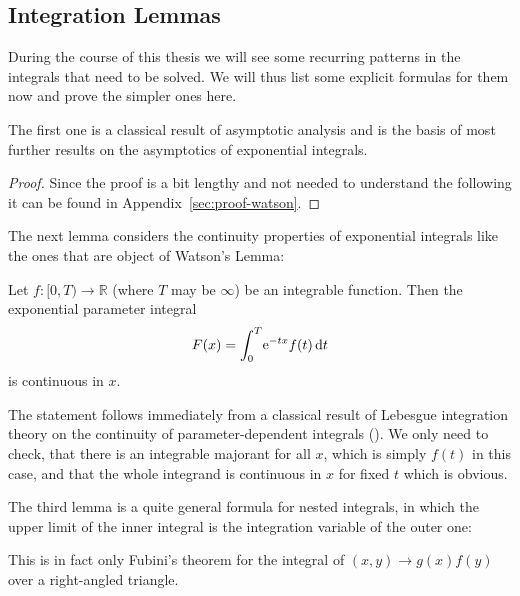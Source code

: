 \subsection{Integration Lemmas}
During the course of this thesis we will see some recurring patterns in the
integrals that need to be solved. We will thus list some explicit formulas for
them now and prove the simpler ones here.

The first one is a classical result of asymptotic analysis and is the basis of
most further results on the asymptotics of exponential integrals.
\begin{Lemma}[Watson]
  
  \begin{proof}
    Since the proof is a bit lengthy and not needed to understand the following
    it can be found in Appendix~\ref{sec:proof-watson}.
  \end{proof}
\end{Lemma}
The next lemma considers the continuity properties of exponential integrals like
the ones that are object of Watson's Lemma:
\begin{Lemma}
  \label{lem:continuity_of_watson_integrals}
  Let $f\colon [0,T)\to\mathbb{R}$ (where $T$ may be $\infty$) be an integrable
  function. Then the exponential parameter integral
  \begin{align*}
    F(x) = \Integ[T]{0}{t}{\Eto{-tx} f(t)}
  \end{align*}
  is continuous in $x$.
  \begin{Proof}
    The statement follows immediately from a classical result of Lebesgue
    integration theory on the continuity of parameter-dependent integrals
    (\cite[p282f]{Konigsberger2004}). We only need to check, that there is an
    integrable majorant for all $x$, which is simply $f(t)$ in this case, and
    that the whole integrand is continuous in $x$ for fixed $t$ which is
    obvious.
  \end{Proof}
\end{Lemma}
The third lemma is a quite general formula for nested integrals, in which the
upper limit of the inner integral is the integration variable of the outer one:

\begin{Remark}
  This is in fact only Fubini's theorem for the integral of $(x,y)\to g(x)f(y)$
  over a right-angled triangle.
\end{Remark}

